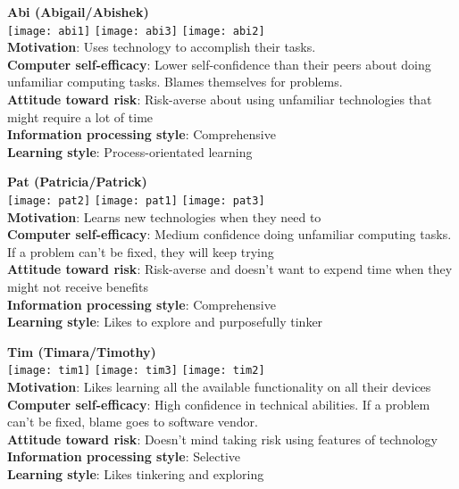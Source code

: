 \begin{tcolorbox}[colback=abicolor!100!white,colframe=abicolor2!100!black]
{\Large \textbf{Abi (Abigail/Abishek)}}\\
\texttt{[image: abi1]}
\texttt{[image: abi3]}
\texttt{[image: abi2]}\\
\textbf{Motivation}: Uses technology to accomplish their tasks.\\
\textbf{Computer self-efficacy}: Lower self-confidence than their peers about doing unfamiliar computing tasks. Blames themselves for problems.\\
\textbf{Attitude toward risk}: Risk-averse about using unfamiliar technologies that might require a lot of time\\
\textbf{Information processing style}: Comprehensive\\
\textbf{Learning style}: Process-orientated learning
\end{tcolorbox}

\begin{tcolorbox}[colback=patcolor!100!white,colframe=patcolor2!100!black]
{\Large \textbf{Pat (Patricia/Patrick)}}\\
\texttt{[image: pat2]}
\texttt{[image: pat1]}
\texttt{[image: pat3]}\\
\textbf{Motivation}: Learns new technologies when they need to\\
\textbf{Computer self-efficacy}: Medium confidence doing unfamiliar computing tasks. If a problem can't be fixed, they will keep trying\\
\textbf{Attitude toward risk}: Risk-averse and doesn't want to expend time when they might not receive benefits\\
\textbf{Information processing style}: Comprehensive\\
\textbf{Learning style}: Likes to explore and purposefully tinker
\end{tcolorbox}

\begin{tcolorbox}[colback=timcolor!100!white,colframe=timcolor2!100!black]
{\Large \textbf{Tim (Timara/Timothy)}}\\
\texttt{[image: tim1]}
\texttt{[image: tim3]}
\texttt{[image: tim2]}\\
\textbf{Motivation}: Likes learning all the available functionality on all their devices\\
\textbf{Computer self-efficacy}: High confidence in technical abilities. If a problem can't be fixed, blame goes to software vendor.\\
\textbf{Attitude toward risk}: Doesn't mind taking risk using features of technology\\
\textbf{Information processing style}: Selective\\
\textbf{Learning style}: Likes tinkering and exploring
\end{tcolorbox}

